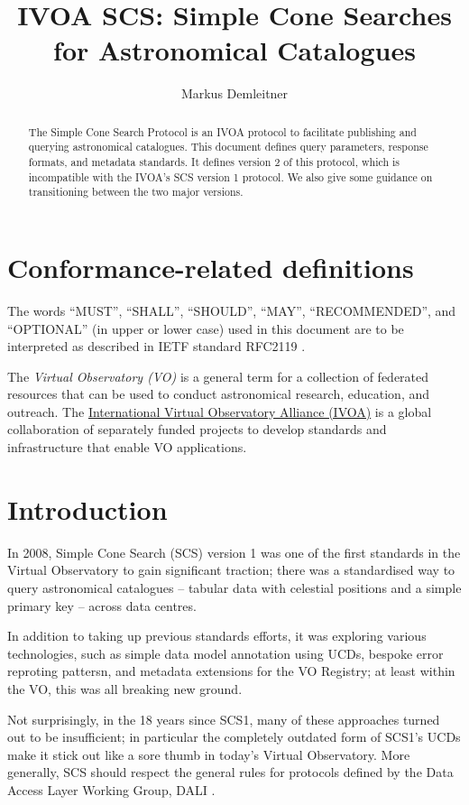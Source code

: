 \documentclass[11pt,a4paper]{ivoa}
\title{IVOA SCS: Simple Cone Searches for Astronomical Catalogues}
\author[https://wiki.ivoa.net/twiki/bin/view/IVOA/MarkusDemleitner]{
  Markus Demleitner}
\begin{document}
\begin{abstract}
The Simple Cone Search Protocol is an IVOA protocol to facilitate
publishing and querying astronomical catalogues.  This document defines
query parameters, response formats, and metadata standards.  It defines
version 2 of this protocol, which is incompatible with the IVOA's SCS
version 1 protocol.  We also give some guidance on transitioning between
the two major versions.
\end{abstract}


\section*{Conformance-related definitions}

The words ``MUST'', ``SHALL'', ``SHOULD'', ``MAY'', ``RECOMMENDED'', and
``OPTIONAL'' (in upper or lower case) used in this document are to be
interpreted as described in IETF standard RFC2119 \citep{std:RFC2119}.

The \emph{Virtual Observatory (VO)} is a
general term for a collection of federated resources that can be used
to conduct astronomical research, education, and outreach.
The \href{https://www.ivoa.net}{International
Virtual Observatory Alliance (IVOA)} is a global
collaboration of separately funded projects to develop standards and
infrastructure that enable VO applications.


\section{Introduction}

In 2008, Simple Cone Search (SCS) version 1 \citep{2008ivoa.specQ0222P}
was one of the first standards in the Virtual Observatory to gain
significant traction; there was a standardised way to query astronomical
catalogues -- tabular data with celestial positions and a simple primary
key -- across data centres.

In addition to taking up previous standards efforts, it was exploring
various technologies, such as simple data model annotation using UCDs,
bespoke error reproting pattersn, and metadata extensions for the VO
Registry; at least within the VO, this was all breaking new ground.

Not surprisingly, in the 18 years since SCS1, many of these approaches
turned out to be insufficient; in particular the completely outdated
form of SCS1's UCDs make it stick out like a sore thumb in today's
Virtual Observatory.  More generally, SCS should respect the general
rules for protocols defined by the Data Access Layer Working Group, DALI
\citep{2017ivoa.spec.0517D}.
\end{document}
